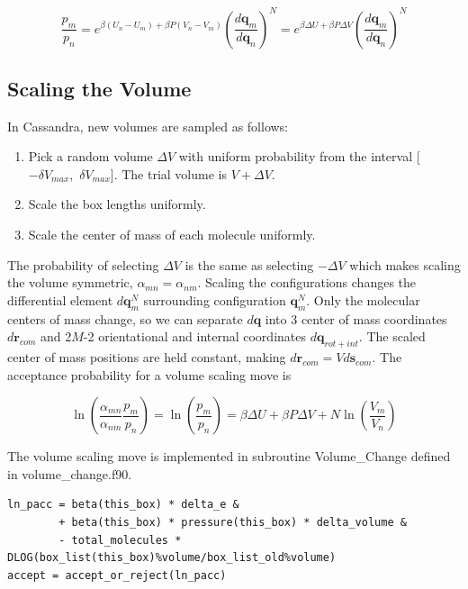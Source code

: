 \begin{equation}
\label{eq:pNPT_ratio}
\frac{p_m}{p_n} = e^{\beta (U_n - U_m) + \beta P (V_n - V_m)} \left(\frac{d\mathbf{q}_m}{d\mathbf{q}_n}\right)^N = e^{\beta \Delta U + \beta P \Delta V} \left(\frac{d\mathbf{q}_m}{d\mathbf{q}_n}\right)^N
\end{equation}

\subsection{Scaling the Volume}
\label{subsec:scaling_the_volume}
In Cassandra, new volumes are sampled as follows:

\begin{enumerate}
	\item Pick a random volume $\Delta V$ with uniform probability from the interval [$-\delta V_{max}$,\ $\delta V_{max}$]. The trial volume is $V + \Delta V$.
	\item Scale the box lengths uniformly.
	\item Scale the center of mass of each molecule uniformly.
\end{enumerate}

The probability of selecting $\Delta V$ is the same as selecting $-\Delta V$ which makes scaling the volume symmetric, $\alpha_{mn}=\alpha_{nm}$. Scaling the configurations changes the differential element $d\mathbf{q}_m^N$ surrounding configuration $\mathbf{q}_m^N$. Only the molecular centers of mass change, so we can separate $d\mathbf{q}$ into 3 center of mass coordinates $d\mathbf{r}_{com}$ and 2$M$-2 orientational and internal coordinates $d\mathbf{q}_{rot+int}$. The scaled center of mass positions are held constant, making $d\mathbf{r}_{com} = V d\mathbf{s}_{com}$. The acceptance probability for a volume scaling move is

\begin{equation}
\label{eq:pAcc_volume}
\ln \left( \frac{\alpha_{mn}}{\alpha_{nm}} \frac{p_m}{p_n} \right) = \ln \left( \frac{p_m}{p_n} \right) = \beta \Delta U + \beta P \Delta V + N \ln\left(\frac{V_m}{V_n}\right)
\end{equation}

The volume scaling move is implemented in subroutine Volume\_Change defined in volume\_change.f90. 

\begin{lstlisting}[firstnumber=475, caption=volume\_change.f90, label=code:volume]
ln_pacc = beta(this_box) * delta_e &
        + beta(this_box) * pressure(this_box) * delta_volume &
        - total_molecules * DLOG(box_list(this_box)%volume/box_list_old%volume)
accept = accept_or_reject(ln_pacc)
\end{lstlisting}


